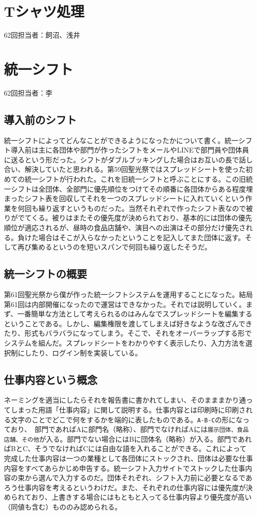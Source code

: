 \documentclass[dvipdfmx,jb5]{jreport}
\begin{document}
\section{Tシャツ処理}
62回担当者：飼沼、浅井

\section{統一シフト}\label{sec:統一シフト}
62回担当者：李
\subsection{導入前のシフト}
統一シフトによってどんなことができるようになったかについて書く。統一シフト導入前は主に各団体や部門が作ったシフトをメールやLINEで部門員や団体員に送るという形だった。シフトがダブルブッキングした場合はお互いの長で話し合い、解決していたと思われる。第59回聖光祭ではスプレッドシートを使った初めての統一シフトが行われた。これを旧統一シフトと呼ぶことにする。この旧統一シフトは全団体、全部門に優先順位をつけてその順番に各団体からある程度埋まったシフト表を回収してそれを一つのスプレッドシートに入れていくという作業を何回も繰り返すというものだった。当然それぞれで作ったシフト表なので被りがでてくる。被りはまたその優先度が決められており、基本的には団体の優先順位が適応されるが、昼時の食品店舗や、演目への出演はその部分だけ優先される。負けた場合はそこが入らなかったということを記入してまた団体に返す。そして再び集めるというのを短いスパンで何回も繰り返したそうだ。
\subsection{統一シフトの概要}
第61回聖光祭から僕が作った統一シフトシステムを運用することになった。結局第61回は内部開催になったので運営はできなかった。それでは説明していく。まず、一番簡単な方法として考えられるのはみんなでスプレッドシートを編集するということである。しかし、編集権限を渡してしまえば好きなような改ざんできたり、形式もバラバラになってしまう。そこで、それをオーバーラップする形でシステムを組んだ。スプレッドシートをわかりやすく表示したり、入力方法を選択制にしたり、ログイン制を実装している。
\subsection{仕事内容という概念}
ネーミングを適当にしたらそれを報告書に書かれてしまい、そのまままかり通ってしまった用語「仕事内容」に関して説明する。仕事内容とは印刷時に印刷される文字のことでどこで何をするかを端的に表したものである。\verb+A-B-C+の形になっており、　部門であればAに部門名（略称）、部門でなければAには\verb+展示団体、食品店舗、その他+が入る。部門でない場合にはBに団体名（略称）が入る。部門であればBとC、そうでなければCには自由な語を入れることができる。これによって完成した仕事内容は一つの業種として各団体にストックされ、団体は必要な仕事内容をすべてあらかじめ申告する。統一シフト入力サイトでストックした仕事内容の束から選んで入力するのだ。団体それぞれ、シフト入力前に必要となるであろう仕事内容を考えるというわけだ。また、それぞれの仕事内容には優先度が決められており、上書きする場合にはもともと入ってる仕事内容より優先度が高い（同値も含む）もののみ認められる。
\end{document}
